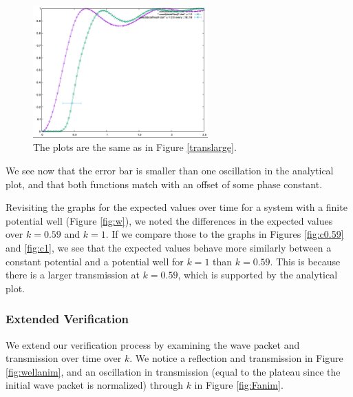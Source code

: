 \documentclass[letterpaper,12pt]{article}
\begin{document}
    \begin{figure}[H]
        \centering
        \includegraphics[width=0.6\textwidth]{transsmall.png}
        \caption[Small Well Transmission]{The plots are the same as in Figure
        \ref{translarge}.}
    \end{figure}

    We see now that the error bar is smaller than one oscillation in the
    analytical plot, and that both functions match with an offset of some phase
    constant.

    Revisiting the graphs for the expected values over time for a system with a
    finite potential well (Figure \ref{fig:w}), we noted the differences in the
    expected values over $k = 0.59$ and $k = 1$. If we compare those to the
    graphs in Figures \ref{fig:c0.59} and \ref{fig:c1}, we see that the expected
    values behave more similarly between a constant potential and a potential
    well for $k = 1$ than $k = 0.59$. This is because there is a larger
    transmission at $k = 0.59$, which is supported by the analytical plot.

    \subsubsection*{Extended Verification}

    We extend our verification process by examining the wave packet and
    transmission over time over $k$. We notice a reflection and transmission in
    Figure \ref{fig:wellanim}, and an oscillation in transmission (equal to the
    plateau since the initial wave packet is normalized) through $k$ in Figure
    \ref{fig:Fanim}.
\end{document}
